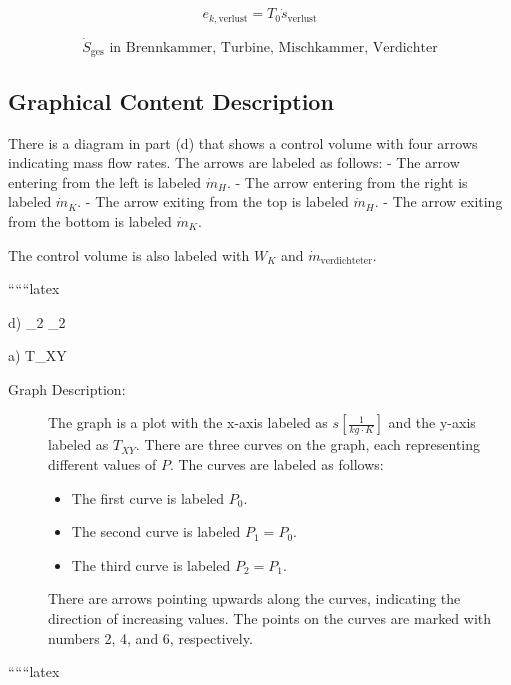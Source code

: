 \[
e_{k, \text{verlust}} = T_0 \dot{s}_{\text{verlust}}
\]

\[
\dot{S}_{\text{ges}} \text{ in Brennkammer, Turbine, Mischkammer, Verdichter}
\]

\subsection*{Graphical Content Description}

There is a diagram in part (d) that shows a control volume with four arrows indicating mass flow rates. The arrows are labeled as follows:
- The arrow entering from the left is labeled $\dot{m}_H$.
- The arrow entering from the right is labeled $\dot{m}_K$.
- The arrow exiting from the top is labeled $\dot{m}_H$.
- The arrow exiting from the bottom is labeled $\dot{m}_K$.

The control volume is also labeled with $W_K$ and $\dot{m}_{\text{verdichteter}}$.

``````latex


d) \quad {}_2 \quad {} \quad {}_2

a) \quad T_{XY}

\begin{description}
    \item[Graph Description:] 
    The graph is a plot with the x-axis labeled as \( s \left[ \frac{1}{kg \cdot K} \right] \) and the y-axis labeled as \( T_{XY} \). There are three curves on the graph, each representing different values of \( P \). The curves are labeled as follows:
    \begin{itemize}
        \item The first curve is labeled \( P_0 \).
        \item The second curve is labeled \( P_1 = P_0 \).
        \item The third curve is labeled \( P_2 = P_1 \).
    \end{itemize}
    There are arrows pointing upwards along the curves, indicating the direction of increasing values. The points on the curves are marked with numbers 2, 4, and 6, respectively.
\end{description}

``````latex


